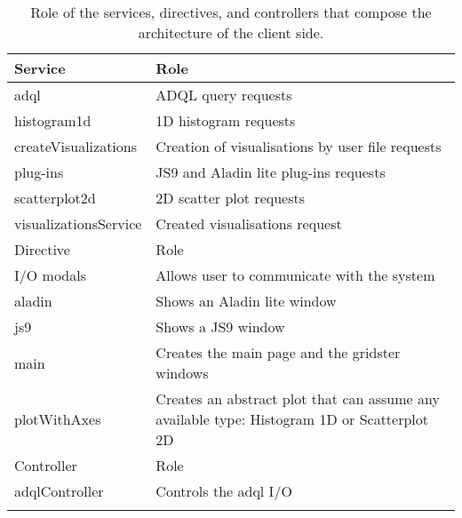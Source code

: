 \documentclass[longauth, final]{aa}
\begin{document}
\begin{table}[ht]
\caption{Role of the services, directives, and controllers that compose the architecture of the client side.}
\label{tab:cli_service}
\begin{tabularx}{0.45\textwidth}{XX}
\\\hline
    \noalign{\smallskip}
Service & Role \\\hline\noalign{\smallskip}
adql & ADQL query requests\\    
    \noalign{\smallskip}%

histogram1d & 1D histogram requests\\    
    \noalign{\smallskip}%

createVisualizations & Creation of visualisations by user file requests\\    
    \noalign{\smallskip}%

plug-ins & JS9 and Aladin lite plug-ins requests\\    
    \noalign{\smallskip}%

scatterplot2d & 2D scatter plot requests\\    
    \noalign{\smallskip}%

visualizationsService & Created visualisations request\\    
    \noalign{\smallskip}\hline    \noalign{\smallskip}
Directive & Role\\\hline\noalign{\smallskip}
I/O modals & Allows  user to communicate with the system\\    
    \noalign{\smallskip}%

aladin & Shows an Aladin lite window\\    
    \noalign{\smallskip}%

js9 & Shows a JS9 window\\    
    \noalign{\smallskip}%

main & Creates the main page and the gridster windows\\    
    \noalign{\smallskip}%

plotWithAxes & Creates an abstract plot that can assume any available type: Histogram 1D or Scatterplot 2D\\    
    \noalign{\smallskip}\hline    \noalign{\smallskip}
Controller & Role\\
    \hline\noalign{\smallskip}
adqlController & Controls the adql I/O\\    
    \noalign{\smallskip}%


\end{tabularx}
\end{table}
\end{document}
